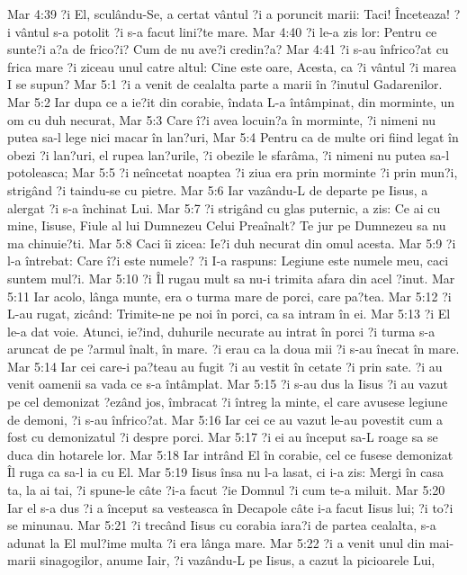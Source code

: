 Mar 4:39  ?i El, sculându-Se, a certat vântul ?i a poruncit marii: Taci! Înceteaza! ?i vântul s-a potolit ?i s-a facut lini?te mare.
Mar 4:40  ?i le-a zis lor: Pentru ce sunte?i a?a de frico?i? Cum de nu ave?i credin?a?
Mar 4:41  ?i s-au înfrico?at cu frica mare ?i ziceau unul catre altul: Cine este oare, Acesta, ca ?i vântul ?i marea I se supun?
Mar 5:1  ?i a venit de cealalta parte a marii în ?inutul Gadarenilor.
Mar 5:2  Iar dupa ce a ie?it din corabie, îndata L-a întâmpinat, din morminte, un om cu duh necurat,
Mar 5:3  Care î?i avea locuin?a în morminte, ?i nimeni nu putea sa-l lege nici macar în lan?uri,
Mar 5:4  Pentru ca de multe ori fiind legat în obezi ?i lan?uri, el rupea lan?urile, ?i obezile le sfarâma, ?i nimeni nu putea sa-l potoleasca;
Mar 5:5  ?i neîncetat noaptea ?i ziua era prin morminte ?i prin mun?i, strigând ?i taindu-se cu pietre.
Mar 5:6  Iar vazându-L de departe pe Iisus, a alergat ?i s-a închinat Lui.
Mar 5:7  ?i strigând cu glas puternic, a zis: Ce ai cu mine, Iisuse, Fiule al lui Dumnezeu Celui Preaînalt? Te jur pe Dumnezeu sa nu ma chinuie?ti.
Mar 5:8  Caci îi zicea: Ie?i duh necurat din omul acesta.
Mar 5:9  ?i l-a întrebat: Care î?i este numele? ?i I-a raspuns: Legiune este numele meu, caci suntem mul?i.
Mar 5:10  ?i Îl rugau mult sa nu-i trimita afara din acel ?inut.
Mar 5:11  Iar acolo, lânga munte, era o turma mare de porci, care pa?tea.
Mar 5:12  ?i L-au rugat, zicând: Trimite-ne pe noi în porci, ca sa intram în ei.
Mar 5:13  ?i El le-a dat voie. Atunci, ie?ind, duhurile necurate au intrat în porci ?i turma s-a aruncat de pe ?armul înalt, în mare. ?i erau ca la doua mii ?i s-au înecat în mare.
Mar 5:14  Iar cei care-i pa?teau au fugit ?i au vestit în cetate ?i prin sate. ?i au venit oamenii sa vada ce s-a întâmplat.
Mar 5:15  ?i s-au dus la Iisus ?i au vazut pe cel demonizat ?ezând jos, îmbracat ?i întreg la minte, el care avusese legiune de demoni, ?i s-au înfrico?at.
Mar 5:16  Iar cei ce au vazut le-au povestit cum a fost cu demonizatul ?i despre porci.
Mar 5:17  ?i ei au început sa-L roage sa se duca din hotarele lor.
Mar 5:18  Iar intrând El în corabie, cel ce fusese demonizat Îl ruga ca sa-l ia cu El.
Mar 5:19  Iisus însa nu l-a lasat, ci i-a zis: Mergi în casa ta, la ai tai, ?i spune-le câte ?i-a facut ?ie Domnul ?i cum te-a miluit.
Mar 5:20  Iar el s-a dus ?i a început sa vesteasca în Decapole câte i-a facut Iisus lui; ?i to?i se minunau.
Mar 5:21  ?i trecând Iisus cu corabia iara?i de partea cealalta, s-a adunat la El mul?ime multa ?i era lânga mare.
Mar 5:22  ?i a venit unul din mai-marii sinagogilor, anume Iair, ?i vazându-L pe Iisus, a cazut la picioarele Lui,
